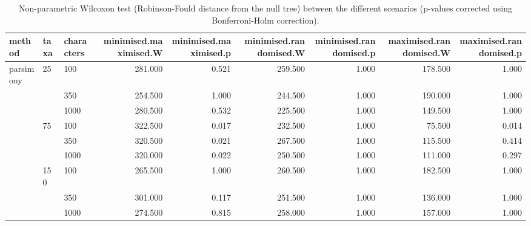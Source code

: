 \begin{table}[ht]
\centering
\begin{tabular}{lllrrrrrr}
  \hline
method & taxa & characters & minimised.maximised.W & minimised.maximised.p & minimised.randomised.W & minimised.randomised.p & maximised.randomised.W & maximised.randomised.p \\ 
  \hline
parsimony & 25 & 100 & 281.000 & 0.521 & 259.500 & 1.000 & 178.500 & 1.000 \\ 
   &  & 350 & 254.500 & 1.000 & 244.500 & 1.000 & 190.000 & 1.000 \\ 
   &  & 1000 & 280.500 & 0.532 & 225.500 & 1.000 & 149.500 & 1.000 \\ 
   & 75 & 100 & 322.500 & 0.017 & 232.500 & 1.000 & 75.500 & 0.014 \\ 
   &  & 350 & 320.500 & 0.021 & 267.500 & 1.000 & 115.500 & 0.414 \\ 
   &  & 1000 & 320.000 & 0.022 & 250.500 & 1.000 & 111.000 & 0.297 \\ 
   & 150 & 100 & 265.500 & 1.000 & 260.500 & 1.000 & 182.500 & 1.000 \\ 
   &  & 350 & 301.000 & 0.117 & 251.500 & 1.000 & 136.000 & 1.000 \\ 
   &  & 1000 & 274.500 & 0.815 & 258.000 & 1.000 & 157.000 & 1.000 \\ 
   \hline
\end{tabular}
\caption{Non-parametric Wilcoxon test (Robinson-Fould distance from the null tree) between the different scenarios (p-values corrected using Bonferroni-Holm correction).} 
\label{Full_Tab_Parsimony_WXRFnull}
\end{table}
